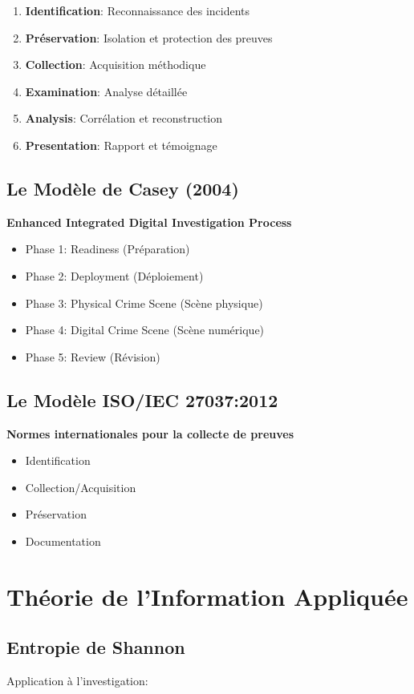 \begin{enumerate}
\item \textbf{Identification}: Reconnaissance des incidents
\item \textbf{Préservation}: Isolation et protection des preuves
\item \textbf{Collection}: Acquisition méthodique
\item \textbf{Examination}: Analyse détaillée
\item \textbf{Analysis}: Corrélation et reconstruction
\item \textbf{Presentation}: Rapport et témoignage
\end{enumerate}

\subsection{Le Modèle de Casey (2004)}
\textbf{Enhanced Integrated Digital Investigation Process}

\begin{itemize}
\item Phase 1: Readiness (Préparation)
\item Phase 2: Deployment (Déploiement)
\item Phase 3: Physical Crime Scene (Scène physique)
\item Phase 4: Digital Crime Scene (Scène numérique)
\item Phase 5: Review (Révision)
\end{itemize}

\subsection{Le Modèle ISO/IEC 27037:2012}
\textbf{Normes internationales pour la collecte de preuves}

\begin{itemize}
\item Identification
\item Collection/Acquisition
\item Préservation
\item Documentation
\end{itemize}

\section{Théorie de l'Information Appliquée}
\subsection{Entropie de Shannon}
Application à l'investigation:

